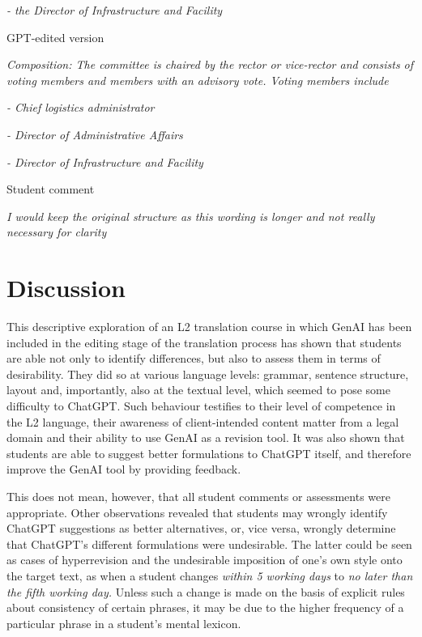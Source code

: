 \documentclass[output=paper]{langscibook}
\begin{document}
    \textit{{}- the Director of Infrastructure and Facility}

    \ex  GPT-edited version

    \textit{Composition: The committee is chaired by the rector or vice-rector and consists of voting members and members with an advisory vote. Voting members include}

    \textit{{}-  Chief logistics administrator}

    \textit{{}-  Director of Administrative Affairs}

    \textit{{}-  Director of Infrastructure and Facility}

    \ex Student comment

    \textit{I would keep the original structure as this wording is longer and not really necessary for clarity}
    \z
\z

\section{Discussion}

This descriptive exploration of an L2 translation course in which GenAI has been included in the editing stage of the translation process has shown that students are able not only to identify differences, but also to assess them in terms of desirability. They did so at various language levels: grammar, sentence structure, layout and, importantly, also at the textual level, which seemed to pose some difficulty to ChatGPT. Such behaviour testifies to their level of competence in the L2 language, their awareness of client-intended content matter from a legal domain and their ability to use GenAI as a revision tool. It was also shown that students are able to suggest better formulations to ChatGPT itself, and therefore improve the GenAI tool by providing feedback. 

This does not mean, however, that all student comments or assessments were appropriate. Other observations revealed that students may wrongly identify ChatGPT suggestions as better alternatives, or, vice versa, wrongly determine that ChatGPT’s different formulations were undesirable. The latter could be seen as cases of hyperrevision \citep{robert2018_revision} and the undesirable imposition of one’s own style onto the target text, as when a student changes \textit{within 5 working days} to \textit{no later than the fifth working day.} Unless such a change is made on the basis of explicit rules about consistency of certain phrases, it may be due to the higher frequency of a particular phrase in a student’s mental lexicon.
\end{document}
